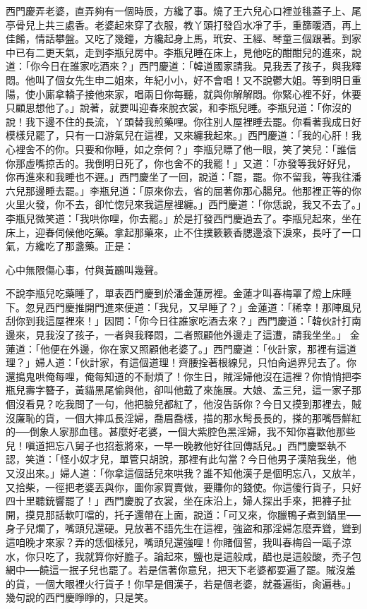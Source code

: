 西門慶弄老婆，直弄夠有一個時辰，方纔了事。燒了王六兒心口裡並毴蓋子上、尾亭骨兒上共三處香。老婆起來穿了衣服，教丫頭打發舀水凈了手，重篩暖酒，再上佳餚，情話攀盤。又吃了幾鐘，方纔起身上馬，玳安、王經、琴童三個跟著。到家中已有二更天氣，走到李瓶兒房中。李瓶兒睡在床上，見他吃的酣酣兒的進來，說道：「你今日在誰家吃酒來？」西門慶道：「韓道國家請我。見我丟了孩子，與我釋悶。他叫了個女先生申二姐來，年紀小小，好不會唱！又不說鬱大姐。等到明日重陽，使小廝拿轎子接他來家，唱兩日你每聽，就與你解解悶。你緊心裡不好，休要只顧思想他了。」說著，就要叫迎春來脫衣裳，和李瓶兒睡。李瓶兒道：「你沒的說！我下邊不住的長流，丫頭替我煎藥哩。你往別人屋裡睡去罷。你看著我成日好模樣兒罷了，只有一口游氣兒在這裡，又來纏我起來。」西門慶道：「我的心肝！我心裡舍不的你。只要和你睡，如之奈何？」李瓶兒瞟了他一眼，笑了笑兒：「誰信你那虛嘴掠舌的。我倒明日死了，你也舍不的我罷！」又道：「亦發等我好好兒，你再進來和我睡也不遲。」西門慶坐了一回，說道：「罷，罷。你不留我，等我往潘六兒那邊睡去罷。」李瓶兒道：「原來你去，省的屈著你那心腸兒。他那裡正等的你火里火發，你不去，卻忙惚兒來我這屋裡纏。」西門慶道：「你恁說，我又不去了。」李瓶兒微笑道：「我哄你哩，你去罷。」於是打發西門慶過去了。李瓶兒起來，坐在床上，迎春伺候他吃藥。拿起那藥來，止不住撲簌簌香腮邊滾下淚來，長吁了一口氣，方纔吃了那盞藥。正是：

心中無限傷心事，付與黃鸝叫幾聲。

不說李瓶兒吃藥睡了，單表西門慶到於潘金蓮房裡。金蓮才叫春梅罩了燈上床睡下。忽見西門慶推開門進來便道：「我兒，又早睡了？」金蓮道：「稀幸！那陣風兒刮你到我這屋裡來！」因問：「你今日往誰家吃酒去來？」西門慶道：「韓伙計打南邊來，見我沒了孩子，一者與我釋悶，二者照顧他外邊走了這遭，請我坐坐。」 金蓮道：「他便在外邊，你在家又照顧他老婆了。」西門慶道：「伙計家，那裡有這道理？」婦人道：「伙計家，有這個道理！齊腰拴著根線兒，只怕肏過界兒去了。你還搗鬼哄俺每哩，俺每知道的不耐煩了！你生日，賊淫婦他沒在這裡？你悄悄把李瓶兒壽字簪子，黃貓黑尾偷與他，卻叫他戴了來施展。大娘、孟三兒，這一家子那個沒看見？吃我問了一句，他把臉兒都紅了，他沒告訴你？今日又摸到那裡去，賊沒廉恥的貨，一個大摔瓜長淫婦，喬眉喬樣，描的那水髩長長的，搽的那嘴唇鮮紅的──倒象人家那血毴。甚麼好老婆，一個大紫腔色黑淫婦，我不知你喜歡他那些兒！嗔道把忘八舅子也招惹將來，一早一晚教他好往回傳話兒。」西門慶堅執不認，笑道：「怪小奴才兒，單管只胡說，那裡有此勾當？今日他男子漢陪我坐，他又沒出來。」婦人道：「你拿這個話兒來哄我？誰不知他漢子是個明忘八，又放羊，又拾柴，一徑把老婆丟與你，圖你家買賣做，要賺你的錢使。你這傻行貨子，只好四十里聽銃響罷了！」西門慶脫了衣裳，坐在床沿上，婦人探出手來，把褲子扯開，摸見那話軟叮噹的，托子還帶在上面，說道：「可又來，你臘鴨子煮到鍋里──身子兒爛了，嘴頭兒還硬。見放著不語先生在這裡，強盜和那淫婦怎麼弄聳，聳到這咱晚才來家？弄的恁個樣兒，嘴頭兒還強哩！你賭個誓，我叫春梅舀一甌子涼水，你只吃了，我就算你好膽子。論起來，鹽也是這般咸，醋也是這般酸，禿子包網中──饒這一抿子兒也罷了。若是信著你意兒，把天下老婆都耍遍了罷。賊沒羞的貨，一個大眼裡火行貨子！你早是個漢子，若是個老婆，就養遍街，肏遍巷。」幾句說的西門慶睜睜的，只是笑。

